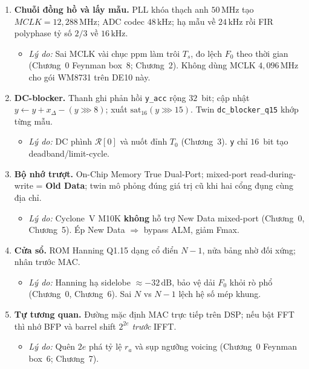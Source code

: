 \begin{enumerate}\setlength{\itemsep}{6pt}
\item \textbf{Chuỗi đồng hồ và lấy mẫu.} PLL khóa thạch anh $50\,\text{MHz}$ tạo $MCLK=12{,}288\,\text{MHz}$; ADC codec $48\,\text{kHz}$; hạ mẫu về $24\,\text{kHz}$ rồi FIR polyphase tỷ số $2/3$ về $16\,\text{kHz}$.
\begin{itemize}[leftmargin=1.2em]
    \item \emph{Lý do:} Sai MCLK vài chục ppm làm trôi $T_s$, đo lệch $F_0$ theo thời gian (Chương~0 Feynman box~8; Chương~2). Không dùng MCLK $4{,}096\,\text{MHz}$ cho gói WM8731 trên DE10 này.
\end{itemize}

\item \textbf{DC-blocker.} Thanh ghi phản hồi \texttt{y\_acc} rộng $32$~bit; cập nhật $y\leftarrow y+x_\Delta-(y\ggg 8)$; xuất $\mathrm{sat}_{16}(y\ggg 15)$. Twin \texttt{dc\_blocker\_q15} khớp từng mẫu.
\begin{itemize}[leftmargin=1.2em]
    \item \emph{Lý do:} DC phình $\mathcal{R}[0]$ và nuốt đỉnh $T_0$ (Chương~3). \texttt{y} chỉ $16$~bit tạo deadband/limit-cycle.
\end{itemize}

\item \textbf{Bộ nhớ trượt.} On-Chip Memory True Dual-Port; mixed-port read-during-write = \textbf{Old Data}; twin mô phỏng đúng giá trị cũ khi hai cổng đụng cùng địa chỉ.
\begin{itemize}[leftmargin=1.2em]
    \item \emph{Lý do:} Cyclone~V M10K \textbf{không} hỗ trợ New Data mixed-port (Chương~0, Chương~5). Ép New Data $\Rightarrow$ bypass ALM, giảm Fmax.
\end{itemize}

\item \textbf{Cửa sổ.} ROM Hanning Q1.15 dạng cổ điển $N-1$, nửa bảng nhờ đối xứng; nhân trước MAC.
\begin{itemize}[leftmargin=1.2em]
    \item \emph{Lý do:} Hanning hạ sidelobe $\approx -32\,\text{dB}$, bảo vệ dải $F_0$ khỏi rò phổ (Chương~0, Chương~6). Sai $N$ vs $N-1$ lệch hệ số mép khung.
\end{itemize}

\item \textbf{Tự tương quan.} Đường mặc định MAC trực tiếp trên DSP; nếu bật FFT thì nhớ BFP và barrel shift $2^{2e}$ \emph{trước} IFFT.
\begin{itemize}[leftmargin=1.2em]
    \item \emph{Lý do:} Quên $2e$ phá tỷ lệ $r_a$ và sụp ngưỡng voicing (Chương~0 Feynman box~6; Chương~7).
\end{itemize}


\end{enumerate}
